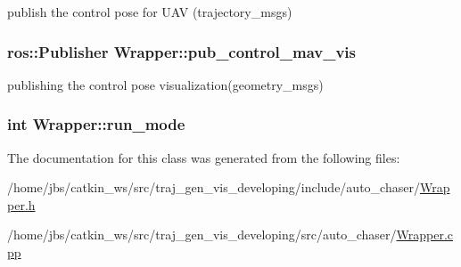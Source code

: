 publish the control pose for U\+AV (trajectory\+\_\+msgs) 

\subsubsection[{\texorpdfstring{pub\+\_\+control\+\_\+mav\+\_\+vis}{pub_control_mav_vis}}]{\setlength{\rightskip}{0pt plus 5cm}ros\+::\+Publisher Wrapper\+::pub\+\_\+control\+\_\+mav\+\_\+vis\hspace{0.3cm}{\ttfamily [private]}}\hypertarget{class_wrapper_a6daec01eda6dbc70e22318a7234fb4e8}{}\label{class_wrapper_a6daec01eda6dbc70e22318a7234fb4e8}


publishing the control pose visualization(geometry\+\_\+msgs) 

\subsubsection[{\texorpdfstring{run\+\_\+mode}{run_mode}}]{\setlength{\rightskip}{0pt plus 5cm}int Wrapper\+::run\+\_\+mode}\hypertarget{class_wrapper_a4b4e8407edf38f99eb9d5a0cd4a0116b}{}\label{class_wrapper_a4b4e8407edf38f99eb9d5a0cd4a0116b}


The documentation for this class was generated from the following files\+:\begin{DoxyCompactItemize}
\item 
/home/jbs/catkin\+\_\+ws/src/traj\+\_\+gen\+\_\+vis\+\_\+developing/include/auto\+\_\+chaser/\hyperlink{_wrapper_8h}{Wrapper.\+h}\item 
/home/jbs/catkin\+\_\+ws/src/traj\+\_\+gen\+\_\+vis\+\_\+developing/src/auto\+\_\+chaser/\hyperlink{_wrapper_8cpp}{Wrapper.\+cpp}\end{DoxyCompactItemize}
